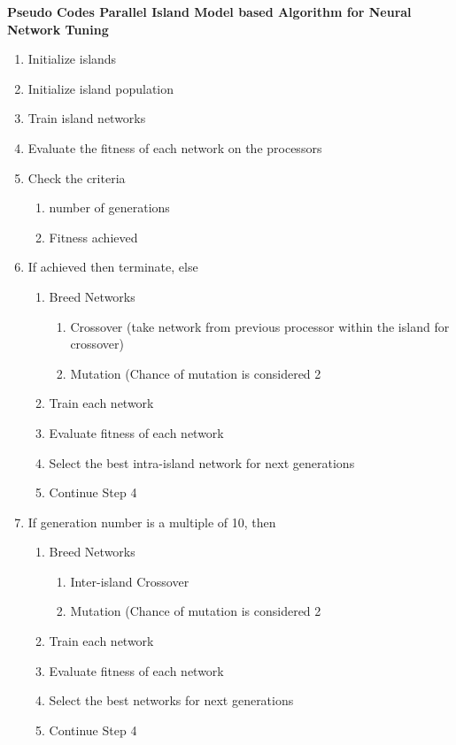 \textbf{Pseudo Codes Parallel Island Model based Algorithm for Neural Network Tuning}

\begin{enumerate}
	
	\item Initialize islands
	\item Initialize island population 
	\item Train island networks 
	\item Evaluate the fitness of each network on the processors
	\item Check the criteria
	\begin{enumerate}
		\item number of generations
		\item Fitness achieved
	\end{enumerate}
	\item If achieved then terminate, else
	\begin{enumerate}
		\item Breed Networks
		\begin{enumerate}
			\item Crossover (take network from previous processor within the island for crossover)
			\item Mutation (Chance of mutation is considered 2%
		\end{enumerate}
		\item Train each network
		\item Evaluate fitness of each network
		\item Select the best intra-island network for next generations
		\item Continue Step 4
	\end{enumerate}
	\item If generation number is a multiple of 10, then
	\begin{enumerate}
		\item Breed Networks
		\begin{enumerate}
			\item Inter-island Crossover 
			\item Mutation (Chance of mutation is considered 2%
		\end{enumerate}
		\item Train each network
		\item Evaluate fitness of each network
		\item Select the best networks for next generations
		\item Continue Step 4
	\end{enumerate}
\end{enumerate}



